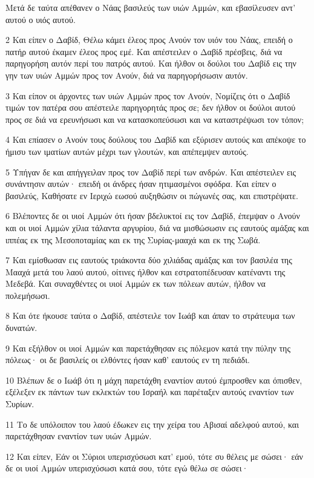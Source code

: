 \par Μετά δε ταύτα απέθανεν ο Νάας βασιλεύς των υιών Αμμών, και εβασίλευσεν αντ' αυτού ο υιός αυτού.
\par 2 Και είπεν ο Δαβίδ, Θέλω κάμει έλεος προς Ανούν τον υιόν του Νάας, επειδή ο πατήρ αυτού έκαμεν έλεος προς εμέ. Και απέστειλεν ο Δαβίδ πρέσβεις, διά να παρηγορήση αυτόν περί του πατρός αυτού. Και ήλθον οι δούλοι του Δαβίδ εις την γην των υιών Αμμών προς τον Ανούν, διά να παρηγορήσωσιν αυτόν.
\par 3 Και είπον οι άρχοντες των υιών Αμμών προς τον Ανούν, Νομίζεις ότι ο Δαβίδ τιμών τον πατέρα σου απέστειλε παρηγορητάς προς σε; δεν ήλθον οι δούλοι αυτού προς σε διά να ερευνήσωσι και να κατασκοπεύσωσι και να καταστρέψωσι τον τόπον;
\par 4 Και επίασεν ο Ανούν τους δούλους του Δαβίδ και εξύρισεν αυτούς και απέκοψε το ήμισυ των ιματίων αυτών μέχρι των γλουτών, και απέπεμψεν αυτούς.
\par 5 Υπήγαν δε και απήγγειλαν προς τον Δαβίδ περί των ανδρών. Και απέστειλεν εις συνάντησιν αυτών· επειδή οι άνδρες ήσαν ητιμασμένοι σφόδρα. Και είπεν ο βασιλεύς, Καθήσατε εν Ιεριχώ εωσού αυξηθώσιν οι πώγωνές σας, και επιστρέψατε.
\par 6 Βλέποντες δε οι υιοί Αμμών ότι ήσαν βδελυκτοί εις τον Δαβίδ, έπεμψαν ο Ανούν και οι υιοί Αμμών χίλια τάλαντα αργυρίου, διά να μισθώσωσιν εις εαυτούς αμάξας και ιππέας εκ της Μεσοποταμίας και εκ της Συρίας-μααχά και εκ της Σωβά.
\par 7 Και εμίσθωσαν εις εαυτούς τριάκοντα δύο χιλιάδας αμάξας και τον βασιλέα της Μααχά μετά του λαού αυτού, οίτινες ήλθον και εστρατοπέδευσαν κατέναντι της Μεδεβά. Και συναχθέντες οι υιοί Αμμών εκ των πόλεων αυτών, ήλθον να πολεμήσωσι.
\par 8 Και ότε ήκουσε ταύτα ο Δαβίδ, απέστειλε τον Ιωάβ και άπαν το στράτευμα των δυνατών.
\par 9 Και εξήλθον οι υιοί Αμμών και παρετάχθησαν εις πόλεμον κατά την πύλην της πόλεως· οι δε βασιλείς οι ελθόντες ήσαν καθ' εαυτούς εν τη πεδιάδι.
\par 10 Βλέπων δε ο Ιωάβ ότι η μάχη παρετάχθη εναντίον αυτού έμπροσθεν και όπισθεν, εξέλεξεν εκ πάντων των εκλεκτών του Ισραήλ και παρέταξεν αυτούς εναντίον των Συρίων.
\par 11 Το δε υπόλοιπον του λαού έδωκεν εις την χείρα του Αβισαί αδελφού αυτού, και παρετάχθησαν εναντίον των υιών Αμμών.
\par 12 Και είπεν, Εάν οι Σύριοι υπερισχύσωσι κατ' εμού, τότε συ θέλεις με σώσει· εάν δε οι υιοί Αμμών υπερισχύσωσι κατά σου, τότε εγώ θέλω σε σώσει·
